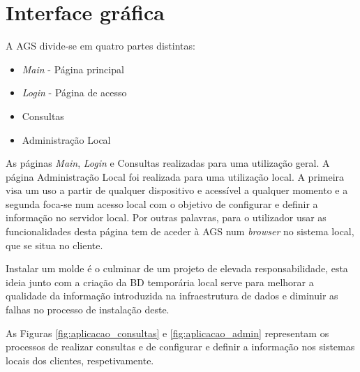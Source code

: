 \documentclass[11pt,twoside,a4paper]{report}
\begin{document}
\section{Interface gráfica}
A AGS divide-se em quatro partes distintas:
\begin{itemize}[noitemsep]
	\item \textit{Main} - Página principal
	\item \textit{Login} - Página de acesso
	\item Consultas
	\item Administração Local
\end{itemize}
As páginas \textit{Main}, \textit{Login} e Consultas realizadas para uma utilização geral. A página Administração Local foi realizada para uma utilização local. A primeira visa um uso a partir de qualquer dispositivo e acessível a qualquer momento e a segunda foca-se num acesso local com o objetivo de configurar e definir a informação no servidor local. Por outras palavras, para o utilizador usar as funcionalidades desta página tem de aceder à AGS num \textit{browser} no sistema local, que se situa no cliente.\par 
Instalar um molde é o culminar de um projeto de elevada responsabilidade, esta ideia junto com a criação da BD temporária local serve para melhorar a qualidade da informação introduzida na infraestrutura de dados e diminuir as falhas no processo de instalação deste.\par
As Figuras \ref{fig:aplicacao_consultas} e \ref{fig:aplicacao_admin} representam os processos de realizar consultas e de configurar e definir a informação nos sistemas locais dos clientes, respetivamente.
\end{document}
